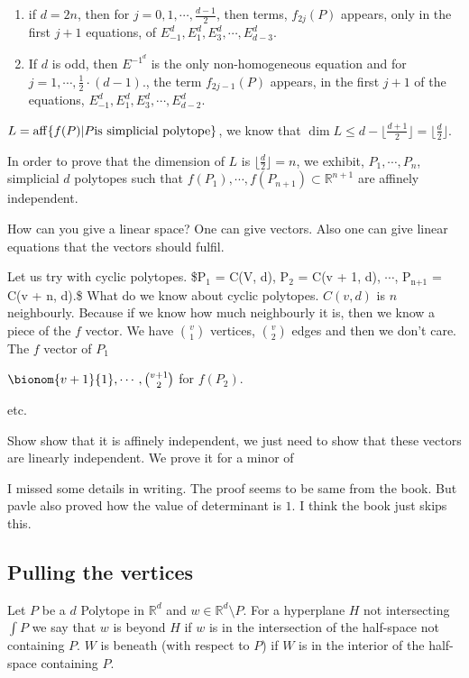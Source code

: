 \documentclass[11pt]{article}
\def\R{\mathbb{R}}
\def\aff{\operatorname{aff}}
\begin{document}
{{{{\begin{enumerate}
\item if \(d = 2n\), then for \(j = 0, 1, \cdots, \frac{d - 1}{2}\), then
terms, \(f_{2j}(P)\) appears, only in the first \(j + 1\) equations, of
\(E_{-1}^d, E_{1}^d, E_3^d, \cdots, E_{d-3}^d\).
\item If \(d\) is odd, then \(E^{-1}^d\) is the only non-homogeneous equation and
for \(j = 1, \cdots, \frac{1}{2}\cdot (d- 1)\)., the term \(f_{2j - 1}(P)\)
appears, in the first \(j + 1\) of the equations, \(E_{-1}^d, E_1^d, E_3^d,
       \cdots, E^d_{d-2}\).
\end{enumerate}

\(L = \aff\{f(P) \vert P \textup{is simplicial polytope}\}\), we know that
\(\dim L \le d - \lfloor \frac{d + 1}{2} \rfloor = \lfloor \frac{d}{2}
    \rfloor\).

In order to prove that the dimension of \(L\) is \(\lfloor \frac{d}{2} \rfloor
    = n\), we exhibit, \(P_1, \cdots, P_n\), simplicial \(d\) polytopes such that
\(f(P_1), \cdots, f(P_{n+1}) \subset \R^{n+1}\) are affinely independent.

How can you give a linear space? One can give vectors. Also one can give
linear equations that the vectors should fulfil.

Let us try with cyclic polytopes. \$P\(_{\text{1}}\) = C(V, d), P\(_{\text{2}}\) = C(v + 1, d), \(\cdots{}\),
P\(_{\text{n+1}}\) = C(v + n, d).\$ What do we know about cyclic polytopes. \(C(v, d)\) is
\(n\) neighbourly. Because if we know how much neighbourly it is, then we know
a piece of the \(f\) vector. We have \(\binom{v}{1}\) vertices, \(\binom{v}{2}\)
edges and then we don't care. The \(f\) vector of \(P_1\)

\(\bionom{v+1}{1}, \cdots, \binom{v+1}{2}\) for \(f(P_2)\).

etc.

Show show that it is affinely independent, we just need to show that these
vectors are linearly independent. We prove it for a minor of

I missed some details in writing. The proof seems to be same from the book.
But pavle also proved how the value of determinant is \(1\). I think the book
just skips this.
\subsection{Pulling the vertices}
\label{sec:orga66b9f1}
Let \(P\) be a \(d\) Polytope in \(\R^d\) and \(w \in \R^d \setminus P\). For a
hyperplane \(H\) not intersecting \(\int P\) we say that \(w\) is beyond \(H\) if \(w\)
is in the intersection of the half-space not containing \(P\). \(W\) is beneath
(with respect to \(P\)) if \(W\) is in the interior of the half-space containing
\(P\).
}}}}
\end{document}
